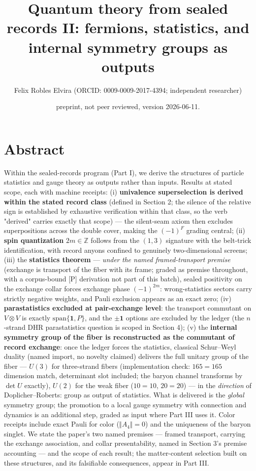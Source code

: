 \documentclass[11pt]{article}
\title{Quantum theory from sealed records II: fermions, statistics, and internal symmetry groups as outputs}
\author{Felix Robles Elvira (ORCID: 0009-0009-2017-4394; independent researcher)}
\date{\small preprint, not peer reviewed, version 2026-06-11.}
\begin{document}
\maketitle

\section*{Abstract}
Within the sealed-records program (Part I), we derive the structures of particle statistics and gauge theory as outputs rather than inputs.  Results at stated scope, each with machine receipts: (i) \textbf{univalence superselection is derived within the stated record class} (defined in Section 2; the silence of the relative sign is established by exhaustive verification within that class, so the verb "derived" carries exactly that scope) — the silent-seam axiom then excludes superpositions across the double cover, making the $(-1)^F$ grading central; (ii) \textbf{spin quantization} $2m \in \mathbb Z$ follows from the $(1,3)$ signature with the belt-trick identification, with record anyons confined to genuinely two-dimensional screens; (iii) the \textbf{statistics theorem} — \emph{under the named framed-transport premise} (exchange is transport of the fiber with its frame; graded as premise throughout, with a corpus-bound [P] derivation not part of this batch), sealed positivity on the exchange collar forces exchange phase $(-1)^{2m}$: wrong-statistics sectors carry strictly negative weights, and Pauli exclusion appears as an exact zero; (iv) \textbf{parastatistics excluded at pair-exchange level}: the transport commutant on $V \otimes V$ is exactly $\mathrm{span}\{\mathbf 1, P\}$, and the $\pm\mathbf 1$ options are excluded by the ledger (the $n$-strand DHR parastatistics question is scoped in Section 4); (v) the \textbf{internal symmetry group of the fiber is reconstructed as the commutant of record exchange}: once the ledger forces the statistics, classical Schur–Weyl duality (named import, no novelty claimed) delivers the full unitary group of the fiber — $U(3)$ for three-strand fibers (implementation check: $165 = 165$ dimension match, determinant slot included; the baryon channel transforms by $\det U$ exactly), $U(2)$ for the weak fiber ($10 = 10$, $20 = 20$) — in the \emph{direction} of Doplicher–Roberts: group as output of statistics.  What is delivered is the \emph{global} symmetry group; the promotion to a local gauge symmetry with connection and dynamics is an additional step, graded as input where Part III uses it.  Color receipts include exact Pauli for color ($\Vert A_4\Vert = 0$) and the uniqueness of the baryon singlet.  We state the paper's two named premises — framed transport, carrying the exchange association, and collar presentability, named in Section 3's premise accounting — and the scope of each result; the matter-content selection built on these structures, and its falsifiable consequences, appear in Part III.
\end{document}
